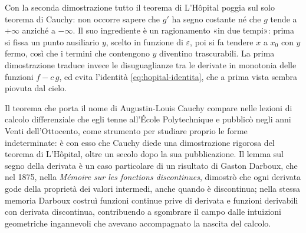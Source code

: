 \begin{osservazione}\label{oss:hopital-due-vie}
Con la seconda dimostrazione tutto il teorema di L'Hôpital poggia sul solo teorema di
Cauchy: non occorre sapere che $g'$ ha segno costante né che $g$ tende a $+\infty$
anziché a $-\infty$. Il suo ingrediente è un ragionamento «in due tempi»: prima si fissa
un punto ausiliario $y$, scelto in funzione di $\varepsilon$, poi si fa tendere $x$ a
$x_{0}$ con $y$ fermo, così che i termini che contengono $y$ diventino trascurabili. La
prima dimostrazione traduce invece le disuguaglianze tra le derivate in monotonia delle
funzioni $f-c\,g$, ed evita l'identità \eqref{eq:hopital-identita}, che a prima vista
sembra piovuta dal cielo.
\end{osservazione}

\begin{notastorica}
Il teorema che porta il nome di Augustin-Louis Cauchy compare nelle lezioni di calcolo
differenziale che egli tenne all'École Polytechnique e pubblicò negli anni Venti
dell'Ottocento, come strumento per studiare proprio le forme indeterminate: è con esso
che Cauchy diede una dimostrazione rigorosa del teorema di L'Hôpital, oltre un secolo
dopo la sua pubblicazione. Il lemma sul segno
della derivata è un caso particolare di un risultato di Gaston Darboux, che nel 1875,
nella \emph{Mémoire sur les fonctions discontinues}, dimostrò che ogni derivata gode
della proprietà dei valori intermedi, anche quando è discontinua; nella stessa memoria
Darboux costruì funzioni continue prive di derivata e funzioni derivabili con derivata
discontinua, contribuendo a sgombrare il campo dalle intuizioni geometriche ingannevoli
che avevano accompagnato la nascita del calcolo.
\end{notastorica}
